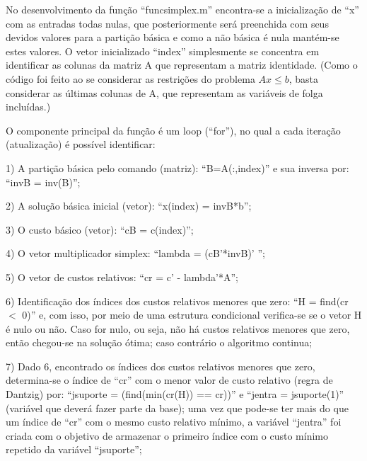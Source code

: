 \documentclass[10pt]{article}
\begin{document}
No desenvolvimento da função ``funcsimplex.m'' encontra-se a inicialização de ``x'' com as entradas todas nulas, que posteriormente será preenchida com seus devidos valores para a partição básica e como a não básica é nula mantém-se estes valores. O vetor inicializado ``index'' simplesmente se concentra em identificar as colunas da matriz A que representam a matriz identidade. (Como o código foi feito ao se considerar as restrições do problema $Ax \le b$, basta considerar as últimas colunas de A, que representam as variáveis de folga incluídas.)
\newline

O componente principal da função é um loop (``for''), no qual a cada iteração (atualização) é possível identificar:
\newline

1) A partição básica pelo comando (matriz): ``B=A(:,index)'' e sua inversa por: ``invB = inv(B)'';
\newline

2) A solução básica inicial (vetor): ``x(index) = invB*b'';
\newline

3) O custo básico (vetor): ``cB = c(index)'';
\newline

4) O vetor multiplicador simplex: ``lambda = (cB'*invB)' '';
\newline

5) O vetor de custos relativos: ``cr = c' - lambda'*A'';
\newline

6) Identificação dos índices dos custos relativos menores que zero: ``H = find(cr $<$ 0)'' e, com isso, por meio de uma estrutura condicional verifica-se se o vetor H é nulo ou não. Caso for nulo, ou seja, não há custos relativos menores que zero, então chegou-se na solução ótima; caso contrário o algoritmo continua;
\newline

7) Dado 6, encontrado os índices dos custos relativos menores que zero, determina-se o índice de ``cr'' com o menor valor de custo relativo (regra de Dantzig) por: ``jsuporte = (find(min(cr(H)) == cr))'' e ``jentra = jsuporte(1)'' (variável que deverá fazer parte da base); uma vez que pode-se ter mais do que um índice de ``cr'' com o mesmo custo relativo mínimo, a variável ``jentra'' foi criada com o objetivo de armazenar o primeiro índice com o custo mínimo repetido da variável ``jsuporte'';
\newline
\end{document}
